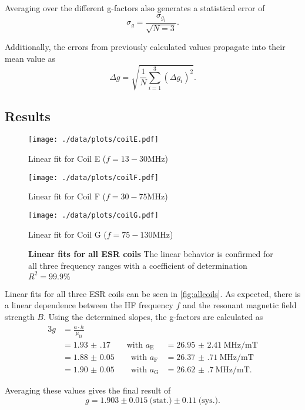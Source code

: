 Averaging over the different g-factors also generates a statistical error of
\begin{equation*}
	\sigma_g = \frac{\sigma_{g_i}}{\sqrt{N=3}}.
\end{equation*}

Additionally, the errors from previously calculated values propagate into their mean value as
\begin{equation*}
	\Delta g = \sqrt{\frac{1}{N}\sum_{i=1}^3 \left(\Delta g_i\right)^2}.
\end{equation*}

\subsection{Results}
\begin{figure}[!htb]
		\texttt{[image: ./data/plots/coilE.pdf]}
		\caption*{Linear fit for Coil E ($f=13-30\si{\MHz}$)}\label{fig:coilE}
	\endminipage\hfill
	\texttt{[image: ./data/plots/coilF.pdf]}
	\caption*{Linear fit for Coil F ($f=30-75\si{\MHz}$)}\label{fig:coilF}
	\endminipage\hfill\centering
	\texttt{[image: ./data/plots/coilG.pdf]}
	\caption*{Linear fit for Coil G ($f=75-130\si{\MHz}$)}\label{fig:coilG}
	\endminipage
	\caption[Linear fits for all ESR coils]{\textbf{Linear fits for all ESR coils} The linear behavior is confirmed for all three frequency ranges with a coefficient of determination $R^2=\num{99.9}\%$}
	\label{fig:allcoils}
\end{figure}

Linear fits for all three ESR coils can be seen in \autoref{fig:allcoils}.
As expected, there is a linear dependence between the HF frequency $f$ and the resonant magnetic field strength $B$.
Using the determined slopes, the g-factors are calculated as
\begin{alignat*}{3}
	g &= \frac{a\cdot h}{\mu_\text{B}} \\
	&= \num{1.93(17)}\qquad\text{with } a_\text{E}&=\SI{26.95(241)}{\MHz\per\milli\tesla} \\
	&= \num{1.88(5)}\qquad\text{with } a_\text{F}&=\SI{26.37(71)}{\MHz\per\milli\tesla} \\
	&= \num{1.90(5)}\qquad\text{with } a_\text{G}&=\SI{26.62(70)}{\MHz\per\milli\tesla}.
\end{alignat*}

Averaging these values gives the final result of
\begin{equation*}
	g = \num{1.903}\pm\num{0.015}\ \text{(stat.)}\pm\num{0.11}\ \text{(sys.)}.
\end{equation*}

